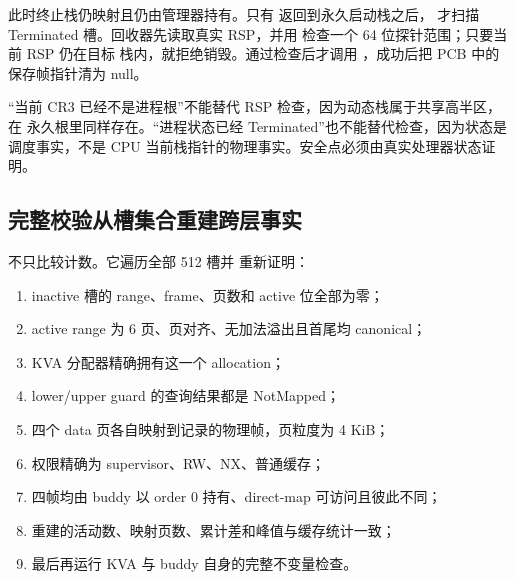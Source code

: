 此时终止栈仍映射且仍由管理器持有。只有
 返回到永久启动栈之后，
 才扫描 Terminated 槽。回收器先读取真实
RSP，并用  检查一个 64 位探针范围；只要当前 RSP 仍在目标
栈内，就拒绝销毁。通过检查后才调用 ，成功后把 PCB 中的
保存帧指针清为 null。

\begin{center}
\end{center}

“当前 CR3 已经不是进程根”不能替代 RSP 检查，因为动态栈属于共享高半区，在
永久根里同样存在。“进程状态已经 Terminated”也不能替代检查，因为状态是
调度事实，不是 CPU 当前栈指针的物理事实。安全点必须由真实处理器状态证明。

\subsection{完整校验从槽集合重建跨层事实}

 不只比较计数。它遍历全部 512 槽并
重新证明：

\begin{enumerate}[label=\arabic*.]
  \item inactive 槽的 range、frame、页数和 active 位全部为零；
  \item active range 为 6 页、页对齐、无加法溢出且首尾均 canonical；
  \item KVA 分配器精确拥有这一个 allocation；
  \item lower/upper guard 的查询结果都是 NotMapped；
  \item 四个 data 页各自映射到记录的物理帧，页粒度为 4 KiB；
  \item 权限精确为 supervisor、RW、NX、普通缓存；
  \item 四帧均由 buddy 以 order 0 持有、direct-map 可访问且彼此不同；
  \item 重建的活动数、映射页数、累计差和峰值与缓存统计一致；
  \item 最后再运行 KVA 与 buddy 自身的完整不变量检查。
\end{enumerate}

